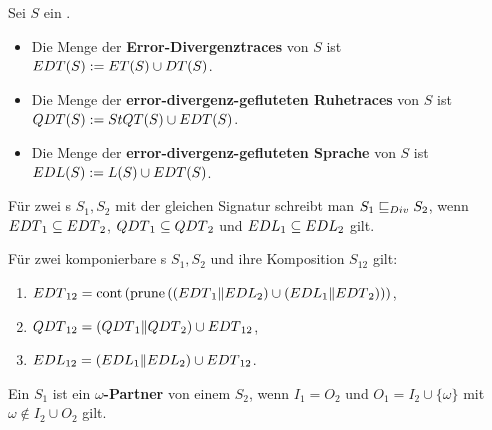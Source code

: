 \begin{frame}
  \begin{Def}
    Sei $S$ ein \EIO{}.
    \begin{itemize}
      \item Die Menge der \textbf{Error-Divergenztraces} von $S$ ist $EDT{}(S) :=
        ET{}(S)\cup DT{}(S)$.
      \item Die Menge der \textbf{error-divergenz-gefluteten Ruhetraces} von $S$
        ist $QDT{}(S) := StQT{}(S)\cup EDT{}(S)$.
      \item Die Menge der \textbf{error-divergenz-gefluteten Sprache} von $S$ ist
        $EDL{}(S) := L(S) \cup EDT{}(S)$.
    \end{itemize}
    Für zwei \EIO{}s $S_1, S_2$ mit der gleichen Signatur schreibt man $S_1\sqsubseteq _{Div}
    S_2$, wenn $EDT{}_1\subseteq EDT{}_2$, $QDT{}_1\subseteq QDT{}_2$ und
    $EDL{}_1\subseteq EDL{}_2$ gilt.
  \end{Def}
\end{frame}

\begin{frame}
  \begin{satz}
    Für zwei komponierbare \EIO{}s $S_1, S_2$ und ihre Komposition
    $S_{12}$ gilt:
    \begin{enumerate}
      \item $EDT{}_{12}=\mathrm{cont} \left(\mathrm{prune} \left(\left(EDT{}_1\|EDL{}_2\right)\cup
        \left(EDL{}_1\|EDT{}_2\right)\right)\right)$,
      \item $QDT{}_{12}=(QDT{}_1\|QDT{}_2)\cup EDT{}_{12}$,
      \item $EDL{}_{12}=(EDL{}_1\|EDL{}_2)\cup EDT{}_{12}$.
    \end{enumerate}
  \end{satz}
\end{frame}

\begin{frame}
  \begin{Def}
    Ein \EIO{} $S_1$ ist ein \textbf{\boldmath$\omega$-Partner} von einem \EIO{} $S_2$, wenn
    $I_1=O_2$ und $O_1=I_2\cup\{\omega\}$ mit $\omega\notin I_2\cup O_2$ gilt.
  \end{Def}
\end{frame}

